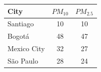\begin{tabular}{lcc}
\toprule
\toprule
\textbf{City} & $PM_{10}$ & $PM_{2.5}$ \\
\midrule
  Santiago &  10 &  10 \\ 
  Bogotá &  48 &  47 \\ 
  Mexico City &  32 &  27 \\ 
  São Paulo &  28 &  24 \\ 
\bottomrule
\bottomrule
\end{tabular}
